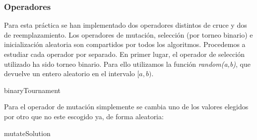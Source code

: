 \documentclass[11pt,a4paper]{article}
\begin{document}
	\subsubsection{Operadores}
	
	Para esta práctica se han implementado dos operadores distintos de cruce y dos de reemplazamiento. Los operadores de mutación, selección (por torneo binario) e inicialización aleatoria son compartidos por todos los algoritmos. Procedemos a estudiar cada operador por separado. En primer lugar, el operador de selección utilizado ha sido torneo binario. Para ello utilizamos la función \emph{random(a,b)}, que devuelve un entero aleatorio en el intervalo $[a,b)$.
	
	\begin{algorithm}[H]
		\caption{binaryTournament}
	\end{algorithm}

	Para el operador de mutación simplemente se cambia uno de los valores elegidos por otro que no este escogido ya, de forma aleatoria: 
	
	\begin{algorithm}[H]
		\caption{mutateSolution}
	\end{algorithm}
	
\end{document}
